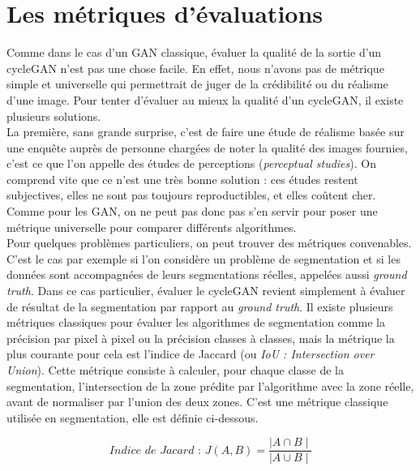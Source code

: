 \section{Les métriques d'évaluations}

Comme dans le cas d'un GAN classique, évaluer la qualité de la sortie d'un cycleGAN n'est pas une chose facile. En effet, nous n'avons pas de métrique simple et universelle qui permettrait de juger de la crédibilité ou du réalisme d'une image. Pour tenter d'évaluer au mieux la qualité d'un cycleGAN, il existe plusieurs solutions.\\

La première, sans grande surprise, c'est de faire une étude de réalisme basée sur une enquête auprès de personne chargées de noter la qualité des images fournies, c'est ce que l'on appelle des études de perceptions (\textit{perceptual studies}). On comprend vite que ce n'est une très bonne solution : ces études restent subjectives, elles ne sont pas toujours reproductibles, et elles coûtent cher. Comme pour les GAN, on ne peut pas donc pas s'en servir pour poser une métrique universelle pour comparer différents algorithmes.\\

Pour quelques problèmes particuliers, on peut trouver des métriques convenables. C'est le cas par exemple si l'on considère un problème de segmentation et si les données sont accompagnées de leurs segmentations réelles, appelées aussi \textit{ground truth}. Dans ce cas particulier, évaluer le cycleGAN revient simplement à évaluer de résultat de la segmentation par rapport au \textit{ground truth}. Il existe plusieurs métriques classiques pour évaluer les algorithmes de segmentation comme la précision par pixel à pixel ou la précision classes à classes, mais la métrique la plus courante pour cela est l'indice de Jaccard (ou \textit{IoU : Intersection over Union}). Cette métrique consiste à calculer, pour chaque classe de la segmentation, l'intersection de la zone prédite par l'algorithme avec la zone réelle, avant de normaliser par l'union des deux zones. C'est une métrique classique utilisée en segmentation, elle est définie ci-dessous.

$$ \textit{Indice de Jacard : }J(A,B) = \frac{ \mid A \cap B \mid }{ \mid A \cup B \mid } $$

